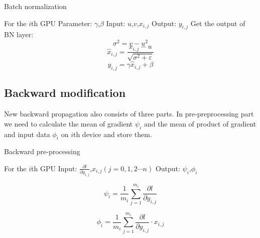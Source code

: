 \begin{algorithm}[h]
\caption{Batch normalization} %
\label{alg:forward-norm}
\begin{algorithmic}[1]
\State For the $i $th GPU
\State Parameter: $\gamma$,$\beta$
\State Input: $u$,$v$,$x_{i,j}$
\State Output: $y_{i,j}$
\State Get the output of BN layer:
\begin{equation}
    {\sigma ^2} = v - {u^2}
\end{equation}
\begin{equation}
    {\hat x_{i,j}} = \frac{{{x_{i,j}} - u}}{{\sqrt {{\sigma ^2} + \varepsilon } }}
\end{equation}
\begin{equation}
    {y_{i,j}} = \gamma {\hat x_{i,j}} + \beta 
\end{equation}
\end{algorithmic}
\end{algorithm}



\subsection{Backward modification}

New backward propagation also consists of three parts. In pre-preprocessing part we need to calculate the mean of gradient $\psi_{i}$ and the mean of product of gradient and input data $\phi_{i}$ on $i$th device and store them.

\begin{algorithm}
    \caption{Backward pre-processing}
    \label{alg:backward-pre}
    \begin{algorithmic}[1]
        \State For the $i$th GPU
        \State Input: $\frac{\partial l}{\partial y_{i,j}}$,$x_{i,j}$$(j = 0,1,2\cdots n)$
        \State Output: $\psi_{i}$,$\phi_{i}$

        \begin{equation}
            {\psi_{i}} = {\frac{1}{m_{i}}} {\sum_{j=1}^{m_{i}} {\frac{\partial l}{\partial y_{i,j}}}}
        \end{equation}

        \begin{equation}
            {\phi_{i}} = {\frac{1}{m_{i}}} {\sum_{j=1}^{m_{i}} {\frac{\partial l}{\partial y_{i,j}}} \cdot {x_{i,j}}}
        \end{equation}
    \end{algorithmic}
\end{algorithm}


